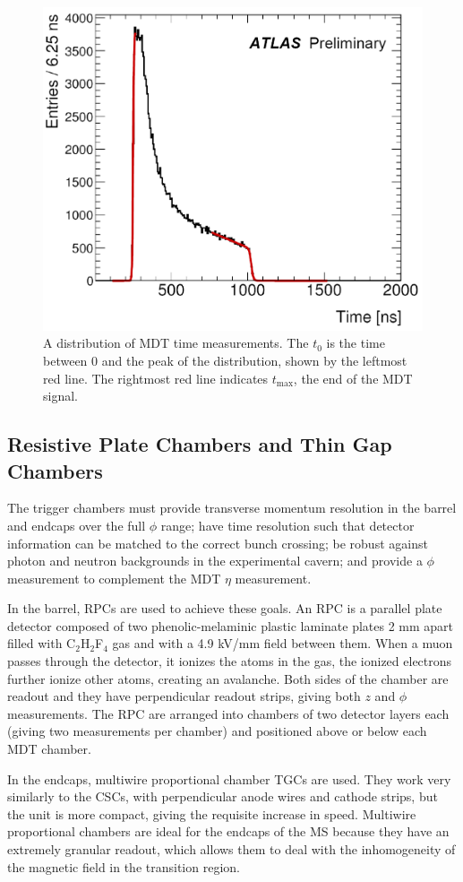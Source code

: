 \begin{figure}[htbp]
\centering
\includegraphics[width=.5\textwidth]{figures/Detector/mdt-t0.png}
\caption{A distribution of \ac{MDT} time measurements. The $t_{0}$ is the time between 0 and the peak of the distribution, shown by the leftmost red line. The rightmost red line indicates $t_{\textrm{max}}$, the end of the \ac{MDT} signal. \cite{muon-public}}
\label{fig:ms-t0fit}
\end{figure}




\subsection{Resistive Plate Chambers and Thin Gap Chambers}

The trigger chambers must provide transverse momentum resolution in the barrel and endcaps over the full $\phi$ range; have time resolution such that detector information can be matched to the correct bunch crossing; be robust against photon and neutron backgrounds in the experimental cavern; and provide a $\phi$ measurement to complement the \ac{MDT} $\eta$ measurement.


In the barrel, \ac{RPC}s are used to achieve these goals. An \ac{RPC} is a parallel plate detector composed of two phenolic-melaminic plastic laminate plates 2 mm apart filled with C$_{2}$H$_{2}$F$_{4}$ gas and with a 4.9 kV/mm field between them. When a muon passes through the detector, it ionizes the atoms in the gas, the ionized electrons further ionize other atoms, creating an avalanche. Both sides of the chamber are readout and they have perpendicular readout strips, giving both $z$ and $\phi$ measurements. The \ac{RPC} are arranged into chambers of two detector layers each (giving two measurements per chamber) and positioned above or below each \ac{MDT} chamber.

In the endcaps, multiwire proportional chamber \ac{TGC}s are used. They work very similarly to the \ac{CSC}s, with perpendicular anode wires and cathode strips, but the unit is more compact, giving the requisite increase in speed. Multiwire proportional chambers are ideal for the endcaps of the \ac{MS} because they have an extremely granular readout, which allows them to deal with the inhomogeneity of the magnetic field in the transition region.



